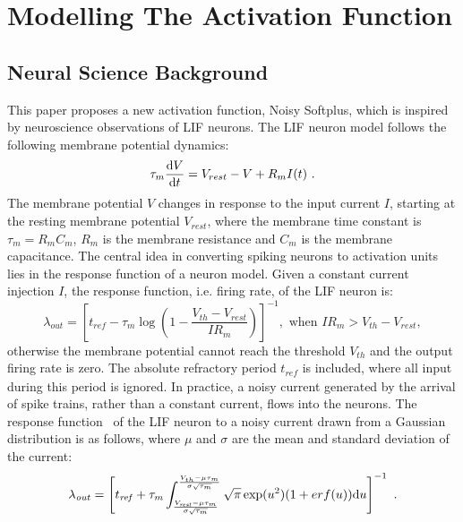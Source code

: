 \section{Modelling The Activation Function}

\subsection{Neural Science Background}
	This paper proposes a new activation function, Noisy Softplus, which is inspired by neuroscience observations of LIF neurons.
	The LIF neuron model follows the following membrane potential dynamics:
	\begin{equation}
	\tau_m \frac{\mathrm{d} V}{\mathrm{d} t}=V_{rest} - V + R_{m} I(t) ~.
	\label{eq:LIF_V}
	\end{equation}
	The membrane potential $V$ changes in response to the input current $I$, starting at the resting membrane potential $V_{rest}$, where the membrane time constant is $\tau_m = R_mC_m$, $R_m$ is the membrane resistance and $C_m$ is the membrane capacitance.
	The central idea in converting spiking neurons to activation units lies in the response function of a neuron model.
	Given a constant current injection $I$, the response function, i.e. firing rate, of the LIF neuron is:
	\begin{equation}
	\lambda_\mathit{out}=
	\left [ t_\mathit{ref}-\tau_m\log \left ( 1-\frac{V_{th}-V_\mathit{rest}}{IR_m}  \right )\right ]^{-1}, \textrm{~when~} IR_m>V_{th}-V_{rest},
	\label{equ:consI}
	\end{equation}
	otherwise the membrane potential cannot reach the threshold $V_{th}$ and the output firing rate is zero. 
	The absolute refractory period $t_\mathit{ref}$ is included, where all input during this period is ignored.
	In practice, a noisy current generated by the arrival of spike trains, rather than a constant current, flows into the neurons.
	The response function~\cite{la2008response}	of the LIF neuron to a noisy current drawn from a Gaussian distribution is as follows, where $\mu$ and $\sigma$ are the mean and standard deviation of the current:
	\begin{equation}
	\lambda_\mathit{out}=
	\left [ t_\mathit{ref}+\tau_m \int_{\frac{V_\mathit{rest}-\mu \tau_m }{\sigma \sqrt{\tau_m}}}^{\frac{V_{th}-\mu \tau_m }{\sigma \sqrt{\tau_m}}} \sqrt{\pi} \exp(u^{2}) (1+erf(u)) \mathrm{d} u \right ]^{-1} ~.
	\label{equ:noiseI}
	\end{equation}
	
